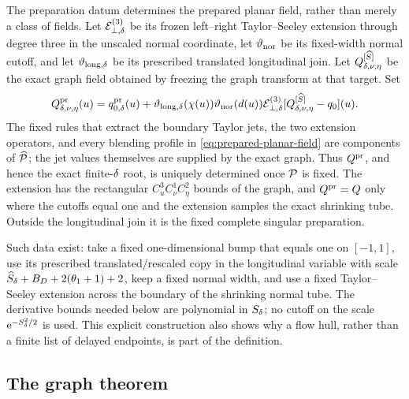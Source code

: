 The preparation datum determines the prepared planar field, rather than
merely a class of fields.  Let
\(\mathcal E_{\perp,\delta}^{(3)}\) be its frozen left--right
Taylor--Seeley extension through degree three in the unscaled normal
coordinate, let \(\vartheta_{\rm nor}\) be its fixed-width normal cutoff,
and let \(\vartheta_{{\rm long},\delta}\) be its prescribed translated
longitudinal join.  Let
\(Q^{[\widehat S]}_{\delta,\nu,\eta}\) be the exact graph field obtained by
freezing the graph transform at that target.  Set
\begin{equation}
\label{eq:prepared-planar-field}
 Q^{\rm pr}_{\delta,\nu,\eta}(u)
 =q_{0,\delta}^{\rm pr}(u)
 +\vartheta_{{\rm long},\delta}(\chi(u))
  \vartheta_{\rm nor}(d(u))
  \mathcal E_{\perp,\delta}^{(3)}
   [Q^{[\widehat S]}_{\delta,\nu,\eta}-q_0](u).
\end{equation}
The fixed rules that extract the boundary Taylor jets, the two extension
operators, and every blending profile in
\cref{eq:prepared-planar-field} are components of \(\widehat{\mathcal P}\); the jet
values themselves are supplied by the exact graph.  Thus \(Q^{\rm pr}\),
and hence the exact finite-\(\delta\)
root, is uniquely determined once \(\mathcal P\) is fixed.  The extension has the
rectangular \(C_u^3C_\nu^1C_\eta^2\) bounds of the graph, and
\(Q^{\rm pr}=Q\) only where the cutoffs equal one and the extension samples
the exact shrinking tube.  Outside the longitudinal join it is the fixed
complete singular preparation.

Such data exist: take a fixed one-dimensional bump that equals one on
\([-1,1]\), use its prescribed translated/rescaled copy in the longitudinal
variable with scale
\(\widehat S_\delta+B_D+2(\theta_1+1)+2\), keep a fixed normal width, and use a fixed
Taylor--Seeley extension across the boundary of the shrinking normal tube.
The derivative bounds needed below are polynomial in \(S_\delta\); no cutoff
on the scale \(\mathrm e^{-S_\delta^2/2}\) is used.  This explicit construction also
shows why a flow hull, rather than a finite list of delayed endpoints, is
part of the definition.

\subsection{The graph theorem}

